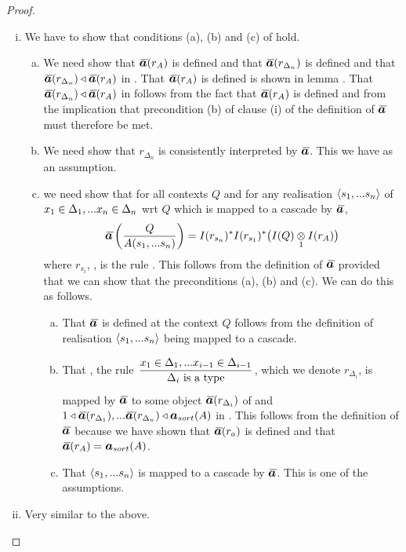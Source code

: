\begin{proof}
\begin{enumerate}[(i) ]
    \item We have to show that conditions (a), (b) and (c) of  hold.
    \begin{enumerate}[(a)]
        \item We need show that $\Ibar(r_A)$ is defined and that $\Ibar(r_{\Delta_n})$ is defined and that $\Ibar(r_{\Delta_n}) \base \Ibar(r_A)$ in \catc.
        That $\Ibar(r_A)$ is defined is shown in lemma . That $\Ibar(r_{\Delta_n}) \base \Ibar(r_A)$ in \catcw follows from 
        the fact that $\Ibar(r_A)$ is defined and from the implication that precondition (b) of clause (i) of the definition of $\Ibar$ must therefore be met.
        \item We need show that $r_{\Delta_n}$ is consistently interpreted by $\Ibar$. This we have as an assumption.
        \item we need show that for all contexts $Q$ and for any realisation $\langle s_1,...s_n\rangle$ of $x_1 \in \Delta_1,... x_{n} \in \Delta_{n}$ wrt $Q$
        which is mapped to a cascade by $\Ibar$,
        $$\ibarmappedrule{Q}{A(s_1,...s_n)}=I(r_{s_n})^*I(r_{s_1})^*\big(\crossx{I(Q)}{I(r_A)}{1}\big)$$
        where $r_{s_i}$, \foreachi, is the rule .
        This follows from the definition of $\Ibar$ provided that we can show that the preconditions (a), (b) and (c). 
        We can do this as follows.
        \begin{enumerate}[(a)]
            \item That $\Ibar$ is defined at the context $Q$ follows from the definition of realisation $\langle s_1,...s_n\rangle$ being mapped to a cascade.
            \item That \foreachi, the rule $\IDelta{i}$, which we denote $r_{\Delta_i}$, is mapped by $\Ibar$ to some object $\Ibar(r_{\Delta_i})$ of \catcw
            and $1 \base \Ibar(r_{\Delta_1}),...\Ibar(r_{\Delta_n}) \base \iI_{sort}(A)$ in \catcw. 
            This follows from the definition of $\Ibar$ because we have shown that $\Ibar(r_a)$ is defined
            and that $\Ibar(r_A)= \iI_{sort}(A)$. 
           \item That $\langle s_1,...s_n\rangle$ is mapped to a cascade by $\Ibar$. This is one of the assumptions.
        \end{enumerate}
    \end{enumerate}
    \item Very similar to the above.
\end{enumerate}
\end{proof}


